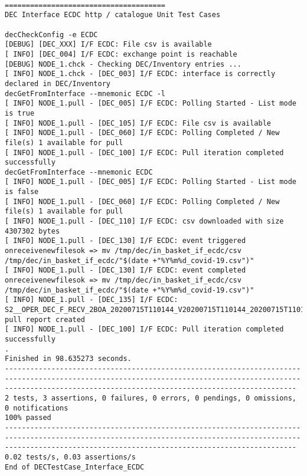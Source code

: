 \documentclass[dec_sum_main.tex]{subfiles}
\begin{document}
\begin{Verbatim}[fontsize=\tiny]

======================================
DEC Interface ECDC http / catalogue Unit Test Cases
	
decCheckConfig -e ECDC
[DEBUG] [DEC_XXX] I/F ECDC: File csv is available
[ INFO] [DEC_004] I/F ECDC: exchange point is reachable 
[DEBUG] NODE_1.chck - Checking DEC/Inventory entries ...
[ INFO] NODE_1.chck - [DEC_003] I/F ECDC: interface is correctly declared in DEC/Inventory 
decGetFromInterface --mnemonic ECDC -l
[ INFO] NODE_1.pull - [DEC_005] I/F ECDC: Polling Started - List mode is true
[ INFO] NODE_1.pull - [DEC_105] I/F ECDC: File csv is available
[ INFO] NODE_1.pull - [DEC_060] I/F ECDC: Polling Completed / New file(s) 1 available for pull
[ INFO] NODE_1.pull - [DEC_100] I/F ECDC: Pull iteration completed successfully
decGetFromInterface --mnemonic ECDC
[ INFO] NODE_1.pull - [DEC_005] I/F ECDC: Polling Started - List mode is false
[ INFO] NODE_1.pull - [DEC_060] I/F ECDC: Polling Completed / New file(s) 1 available for pull
[ INFO] NODE_1.pull - [DEC_110] I/F ECDC: csv downloaded with size 4307302 bytes
[ INFO] NODE_1.pull - [DEC_130] I/F ECDC: event triggered onreceivenewfilesok => mv /tmp/dec/in_basket_if_ecdc/csv /tmp/dec/in_basket_if_ecdc/"$(date +"%Y%m%d_covid-19.csv")"
[ INFO] NODE_1.pull - [DEC_130] I/F ECDC: event completed onreceivenewfilesok => mv /tmp/dec/in_basket_if_ecdc/csv /tmp/dec/in_basket_if_ecdc/"$(date +"%Y%m%d_covid-19.csv")"
[ INFO] NODE_1.pull - [DEC_135] I/F ECDC: S2__OPER_DEC_F_RECV_2BOA_20200715T110144_V20200715T110144_20200715T110144_ECDC.xml pull report created
[ INFO] NODE_1.pull - [DEC_100] I/F ECDC: Pull iteration completed successfully
.
Finished in 98.635273 seconds.
-----------------------------------------------------------------------------------------------------------------------------------------------------------------------------------------------------------------
2 tests, 3 assertions, 0 failures, 0 errors, 0 pendings, 0 omissions, 0 notifications
100% passed
-----------------------------------------------------------------------------------------------------------------------------------------------------------------------------------------------------------------
0.02 tests/s, 0.03 assertions/s
End of DECTestCase_Interface_ECDC

\end{Verbatim}

\end{document}
